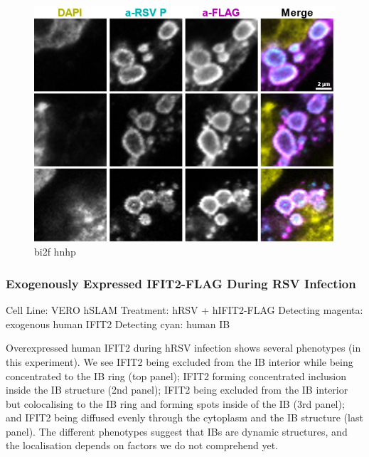 \begin{figure}
    \centering
    \includegraphics[width=1\linewidth]{10. Chapter 5//Figs//03. IFIT2-FLAG/03. bi2f bnbp.png}
    \caption[bi2f hnhp]{bi2f hnhp}
    \label{bi2f hnhp}
\end{figure}

\subsubsection{Exogenously Expressed IFIT2-FLAG During RSV Infection} \label{Exogenously Expressed IFIT2-FLAG During RSV Infection}
Cell Line: VERO hSLAM \newline
Treatment: hRSV + hIFIT2-FLAG \newline
Detecting magenta: exogenous human IFIT2 \newline
Detecting cyan: human IB \newline

Overexpressed human IFIT2 during hRSV infection shows several phenotypes (in this experiment). We see IFIT2 being excluded from the IB interior while being concentrated to the IB ring (top panel); IFIT2 forming concentrated inclusion inside the IB structure (2nd panel); IFIT2 being excluded from the IB interior but colocalising to the IB ring and forming spots inside of the IB (3rd panel); and IFIT2 being diffused evenly through the cytoplasm and the IB structure (last panel). The different phenotypes suggest that IBs are dynamic structures, and the localisation depends on factors we do not comprehend yet. 

